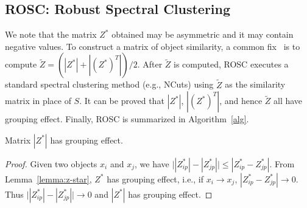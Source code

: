 \subsection*{ROSC: Robust Spectral Clustering}

We note that the matrix $Z^*$ obtained may be asymmetric and it may contain negative values.
To construct a matrix of object similarity, a common fix~\cite{liu2013robust,lu2012robust} is to 
compute $\tilde{Z} = (|Z^*|+|(Z^*)^T|)/2$.
After $\tilde{Z}$ is computed, ROSC executes a standard spectral clustering method
(e.g., NCuts) using $\tilde{Z}$ as the similarity matrix in place of $S$.
It can be proved that $|Z^*|$, $|(Z^*)^T|$, and hence $\tilde{Z}$ all have grouping effect.
Finally, ROSC is summarized in Algorithm~\ref{alg}.

\begin{lemma}
Matrix $|Z^*|$ has grouping effect.
\label{lemma:z-star-abs}
\end{lemma}
\begin{proof}
Given two objects $x_i$ and $x_j$,
we have 
$\bigl||Z_{ip}^*|-|Z_{jp}^*|\bigr| \leq |Z_{ip}^*-Z_{jp}^*|$.
From Lemma~\ref{lemma:z-star},
$Z^*$ has grouping effect, i.e.,
if $x_i \rightarrow x_j$, $|Z_{ip}^*-Z_{jp}^*| \rightarrow 0$.
Thus $\bigl||Z_{ip}^*|-|Z_{jp}^*|\bigr| \rightarrow 0$ and 
$|Z^*|$ has grouping effect.
\end{proof}

